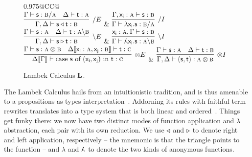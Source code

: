 \begin{figure}
	\centering
	\begin{tabularx}{0.975\textwidth}{@{}CC@{}}
		\\[2em]
		$\infer[\divright E]{\Gamma, \Delta \vdash \term{s}\appright\term{t}: \prop B}{\Gamma \vdash  \term{s}: \prop{B} \divright \prop{A} & \Delta \vdash \term{t}: \prop{A}}$
		& 
		$\infer[\divright I]{\Gamma \vdash \term{\lambda x_i .s}: \prop{B} \divright \prop{A}}{\Gamma, \term{x_i }: \prop A \vdash \term{s}: \prop{B}}$\\[2em]
		$\infer[\divleft E]{\Gamma, \Delta \vdash \term{s}\appleft\term{t}:\prop B}{\Gamma \vdash \term{s}:\prop A & \Delta \vdash \term{t}:\prop{A}\divleft\prop{B}}$
		& 
		$\infer[\divleft I]{\Gamma \vdash \term{\adbmal x_i .s}: \prop A \divleft \prop B}{\term{x_i }: \prop A, \Gamma \vdash \term{s}: \prop B}$\\[2em]
		$\infer[\otimes E]{\Delta\ctx{\Gamma} \vdash \cterm{case \term{s} of \term{(x_i , x_j)} in \term{t}}: \prop C}{
			\Gamma \vdash \term{s}: \prop{A}\otimes\prop{B}
			&
			\Delta\ctx{\term{x_i }: \prop A, \term{x_j}: \prop{B}}  \vdash \term{t}: \prop C}$
		&
		$\infer[\otimes I]{\Gamma,\Delta \vdash \term{(s,t)}: \prop A \otimes \prop B}{\Gamma \vdash \term{s}: \prop A & \Delta \vdash \term{t}: \prop B}$\\[2em]
	\end{tabularx}
	\caption{Lambek Calculus $\textbf{L}$.}
	\label{figure:lambek_calculus_rules}
\end{figure}

The Lambek Calculus hails from an intuitionistic tradition, and is thus amenable to a propositions as types interpretation~\cite{wansing1990formulas}.
Addorning its rules with faithful term rewrites translates into a type system that is both linear and ordered~\cite{pierce2004advanced}.
Things get funky there: we now have two distinct modes of function application and $\lambda$ abstraction, each pair with its own reduction.
We use $\triangleleft$ and $\triangleright$ to denote right and left application, respectively -- the mnemonic is that the triangle points to the function -- and $\lambda$ and $\adbmal$ to denote the two kinds of anonymous functions.

